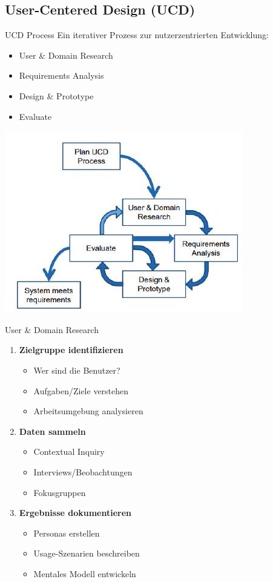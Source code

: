 \subsection{User-Centered Design (UCD)}

\begin{concept}{UCD Process}
Ein iterativer Prozess zur nutzerzentrierten Entwicklung:
\begin{itemize}
    \item User \& Domain Research
    \item Requirements Analysis  
    \item Design \& Prototype
    \item Evaluate
\end{itemize}
\includegraphics[width=0.9\linewidth]{images/2024_12_29_0d1d7b5551ea1b4b41bdg-03}
\end{concept}

\begin{KR}{User \& Domain Research}
\begin{enumerate}
    \item \textbf{Zielgruppe identifizieren}
    \begin{itemize}
        \item Wer sind die Benutzer?
        \item Aufgaben/Ziele verstehen 
        \item Arbeitsumgebung analysieren
    \end{itemize}
    \item \textbf{Daten sammeln}
    \begin{itemize}
        \item Contextual Inquiry
        \item Interviews/Beobachtungen
        \item Fokusgruppen
    \end{itemize}
    \item \textbf{Ergebnisse dokumentieren}
    \begin{itemize}
        \item Personas erstellen
        \item Usage-Szenarien beschreiben
        \item Mentales Modell entwickeln
    \end{itemize}
\end{enumerate}
\end{KR}

